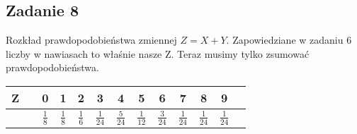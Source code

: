 \documentclass[a4paper]{article}
\begin{document}
\subsection*{Zadanie 8}
Rozkład prawdopodobieństwa zmiennej $Z=X+Y$. Zapowiedziane w zadaniu 6 liczby w nawiasach to właśnie nasze Z. Teraz musimy tylko zsumować prawdopodobieństwa.

\begin{tabular}{c *{11}{c|} c}
Z && 0 & 1 & 2 & 3 & 4 & 5 & 6 & 7 & 8 & 9\\\hline
&&  $\frac{1}{8}$ & $\frac{1}{8}$ & $\frac{1}{6}$ & $\frac{1}{24}$ & $\frac{5}{24}$ & $\frac{1}{12}$ & $\frac{3}{24}$ & $\frac{1}{24}$ & $\frac{1}{24}$ & $\frac{1}{24}$\\
\end{tabular}
\end{document}
